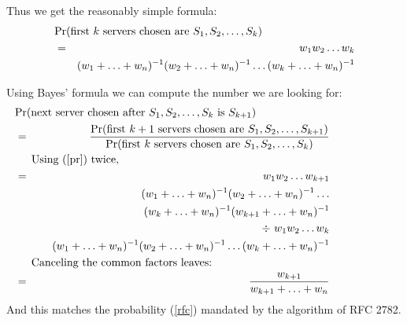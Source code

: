 Thus we get the reasonably simple formula:
\begin{eqnarray}
\lefteqn{\Pr{first $k$ servers chosen are $S_1, S_2, \ldots, S_{k}$}} \nonumber \\
&=& w_1 w_2 \ldots w_k \nonumber \\
&& (w_1 + \ldots + w_n)^{-1}
(w_2 + \ldots + w_n)^{-1}
\ldots
(w_k + \ldots + w_n)^{-1} \label{pr}
\end{eqnarray}

Using Bayes' formula we can compute the number we are looking for:
\begin{eqnarray}
\lefteqn{\Pr{next server chosen after $S_1, S_2, \ldots, S_k$ is
    $S_{k+1}$}} \nonumber \\
&=& \frac{\Pr{first $k+1$ servers chosen are $S_1, S_2, \ldots, S_{k+1}$}}
{\Pr{first $k$ servers chosen are $S_1, S_2, \ldots, S_{k}$}} \\
\noalign{Using (\ref{pr}) twice,}
&=& w_1 w_2 \ldots w_{k+1} \nonumber \\
&& (w_1 + \ldots + w_n)^{-1}
(w_2 + \ldots + w_n)^{-1}
\ldots \nonumber \\
&& \ \  (w_k + \ldots + w_n)^{-1}
(w_{k+1} + \ldots + w_n)^{-1} \nonumber \\
&& \div \  w_1 w_2 \ldots w_k \nonumber \\
&& \ \ \ \  (w_1 + \ldots + w_n)^{-1} (w_2 + \ldots + w_n)^{-1}
\ldots
(w_k + \ldots + w_n)^{-1} \nonumber \\
\noalign{Canceling the common factors leaves:}
&=& \frac{w_{k+1}}
{w_{k+1} + \ldots + w_n}
\end{eqnarray}
And this matches the probability (\ref{rfc}) mandated by the algorithm
of RFC 2782.


